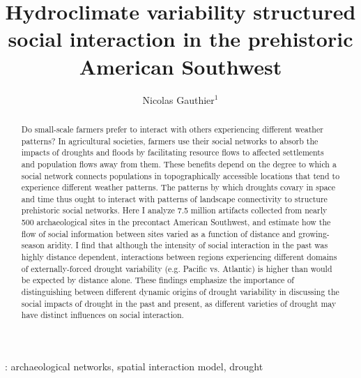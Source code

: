\documentclass[10pt]{iopart}
\begin{document}
\title{Hydroclimate variability structured social interaction in the prehistoric American Southwest}

\author{Nicolas Gauthier$^1$}

\address{$^1$ School of Human Evolution and Social Change, 900 S Caddy Mall, Tempe, USA}


\begin{abstract}
  Do small-scale farmers prefer to interact with others experiencing different weather patterns? In agricultural societies, farmers use their social networks to absorb the impacts of droughts and floods by facilitating resource flows to affected settlements and population flows away from them. These benefits depend on the degree to which a social network connects populations in topographically accessible locations that tend to experience different weather patterns. The patterns by which droughts covary in space and time thus ought to interact with patterns of landscape connectivity to structure prehistoric social networks. Here I analyze 7.5 million artifacts collected from nearly 500 archaeological sites in the precontact American Southwest, and estimate how the flow of social information between sites varied as a function of distance and growing-season aridity. I find that although the intensity of social interaction in the past was highly distance dependent, interactions between regions experiencing different domains of externally-forced drought variability (e.g. Pacific vs. Atlantic) is higher than would be expected by distance alone. These findings emphasize the importance of distinguishing between different dynamic origins of drought variability in discussing the social impacts of drought in the past and present, as different varieties of drought may have distinct influences on social interaction.
\end{abstract}

: archaeological networks, spatial interaction model, drought

\maketitle

\ioptwocol
\end{document}
